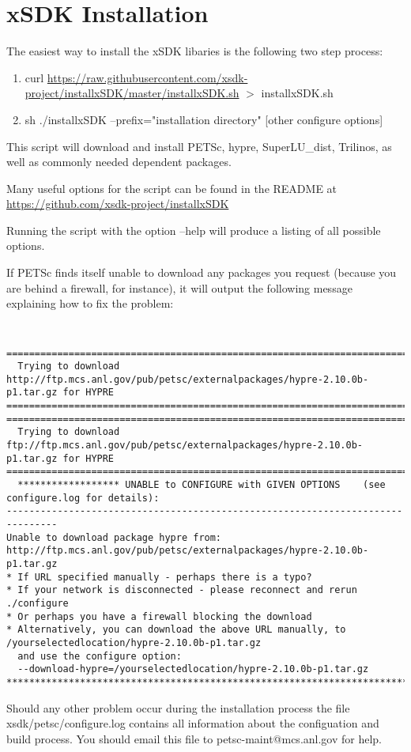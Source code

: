 \chapter{xSDK Installation}


The easiest way to install the xSDK libaries is the following two step process:

\begin{enumerate}
  \item curl \url{https://raw.githubusercontent.com/xsdk-project/installxSDK/master/installxSDK.sh} $ > $ installxSDK.sh
  \item sh ./installxSDK --prefix="installation directory" [other configure options]
\end{enumerate}

This script will download and install PETSc, hypre, SuperLU\_dist, Trilinos, as well as commonly needed dependent packages.

Many useful options for the script can be found in the README at \url{https://github.com/xsdk-project/installxSDK}

Running the script with the option --help will produce a listing of all possible options.

If PETSc finds itself unable to download any packages you request (because you
are behind a firewall, for instance), it will output the following message
explaining how to fix the problem:

{\tt \scriptsize
\begin{verbatim}
===============================================================================                                                                
  Trying to download http://ftp.mcs.anl.gov/pub/petsc/externalpackages/hypre-2.10.0b-p1.tar.gz for HYPRE 
=============================================================================== 
===============================================================================                                                                
  Trying to download ftp://ftp.mcs.anl.gov/pub/petsc/externalpackages/hypre-2.10.0b-p1.tar.gz for HYPRE 
===============================================================================                                                                                                                                                                                                 
  ****************** UNABLE to CONFIGURE with GIVEN OPTIONS    (see configure.log for details):
-------------------------------------------------------------------------------
Unable to download package hypre from: http://ftp.mcs.anl.gov/pub/petsc/externalpackages/hypre-2.10.0b-p1.tar.gz
* If URL specified manually - perhaps there is a typo?
* If your network is disconnected - please reconnect and rerun ./configure
* Or perhaps you have a firewall blocking the download
* Alternatively, you can download the above URL manually, to /yourselectedlocation/hypre-2.10.0b-p1.tar.gz
  and use the configure option:
  --download-hypre=/yourselectedlocation/hypre-2.10.0b-p1.tar.gz
*******************************************************************************
\end{verbatim}
}

Should any other problem occur during the installation process the
file xsdk/petsc/configure.log contains all information about the
configuation and build process. You should email this file to
petsc-maint@mcs.anl.gov for help.


